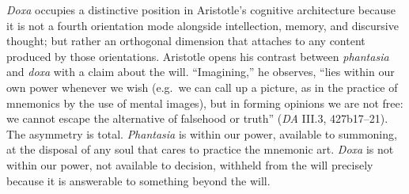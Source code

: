 \documentclass{article}
\begin{document}
\textit{Doxa} occupies a distinctive position in Aristotle's cognitive architecture because it is not a fourth orientation mode alongside intellection, memory, and discursive thought; but rather an orthogonal dimension that attaches to any content produced by those orientations. Aristotle opens his contrast between \textit{phantasia} and \textit{doxa} with a claim about the will. ``Imagining,'' he observes, ``lies within our own power whenever we wish (e.g.\ we can call up a picture, as in the practice of mnemonics by the use of mental images), but in forming opinions we are not free: we cannot escape the alternative of falsehood or truth'' (\textit{DA} III.3, 427b17--21). The asymmetry is total. \textit{Phantasia} is within our power, available to summoning, at the disposal of any soul that cares to practice the mnemonic art. \textit{Doxa} is not within our power, not available to decision, withheld from the will precisely because it is answerable to something beyond the will. 
\end{document}
